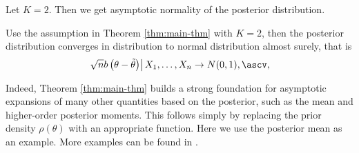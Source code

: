 Let $K=2$. Then we get asymptotic normality of the posterior distribution. 
\begin{corollary}
\label{cor:bernstein-von-Mises}
Use the assumption in Theorem \ref{thm:main-thm} with $K=2$, then
the posterior distribution converges in distribution to normal distribution
almost surely, that is 
\[
\left.\sqrt{n}b\left(\theta-\tilde{\theta}\right)\right|X_{1},\ldots,X_{n}\rightarrow N(0,1),\ascv,
\]

\end{corollary}
Indeed, Theorem \ref{thm:main-thm} builds a strong foundation for 
asymptotic expansions of many other quantities based on the posterior,
such as the mean and higher-order posterior moments. This follows simply by replacing the prior density $\rho\left(\theta\right)$ with an
appropriate function. Here we use the posterior mean as an example. More
examples can be  found in \cite{johnson1970asymptotic}.

